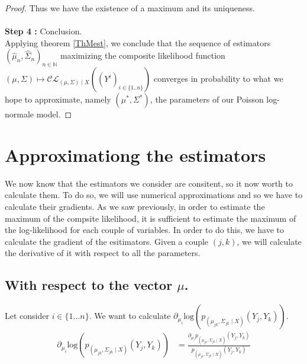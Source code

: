 \documentclass[11pt, a4paper]{article}
\begin{document}
\begin{proof}
Thus we have the existence of a maximum and its uniqueness.\\
\\
\textbf{Step 4 :} Conclusion.\\
Applying theorem \ref{ThMest}, we conclude that the sequence of estimators $(\widehat{\mu}_n, \widehat{\Sigma}_n)_{n \in \mathbb{N}}$ maximizing the composite likelihood function $(\mu,\Sigma) \mapsto \mathcal{CL}_{(\mu,\Sigma) \mid X}((Y^i)_{i \in \{1..n\}})$  converges in probability to what we hope to approximate, namely $(\mu^\ast, \Sigma^\ast)$, the parameters of our Poisson log-normale model.
\end{proof}

\section{Approximationg the estimators}
We now know that the estimators we consider are consitent, so it now worth to calculate them. To do so, we will use numerical approximations and so we have to calculate their gradients. As we saw previously, in order to estimate the maximum of the compsite likelihood, it is sufficient to estimate the maximum of the log-likelihood for each couple of variables. In order to do this, we have to calculate the gradient of the esitimators. Given a couple $(j,k)$, we will calculate the derivative of it with respect to all the parameters.
\subsection{With respect to the vector $\mu$.}
Let consider $i \in \{1...n\}$. We want to calculate $\partial_{\mu_i}\mathrm{log}( p_{(\mu_{jk},\Sigma_{jk} \mid X)}(Y_j,Y_k))$.
\begin{align*}
\partial_{\mu_i}\mathrm{log}( p_{(\mu_{jk},\Sigma_{jk} \mid X)}(Y_j,Y_k)) &= \frac{\partial_{\mu_i}p_{(\mu_{jk},\Sigma_{jk} \mid X)}(Y_j,Y_k) }{p_{(\mu_{jk},\Sigma_{jk} \mid X)}(Y_j,Y_k)}
\end{align*}
\end{document}
